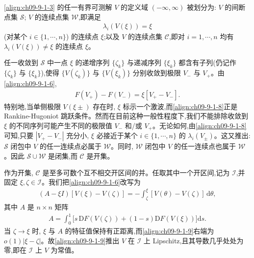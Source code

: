 \documentclass[../../main.tex]{subfiles}
\begin{document}
\eqref{align:ch09-9-1-3} 的任一有界可测解 $V$ 的定义域 $(-\infty,\infty)$ 被划分为: $V$ 的间断点集 $\mathscr{S}$; $V$ 的连续点集 $\mathscr{W}$,即满足
\begin{align}
\lambda_{i}(V(\xi))=\xi
\label{align:ch09-9-1-7}
\end{align}
(对某个 $i\in\{1,\cdots ,n\}$) 的连续点 $\xi$;以及 $V$ 的连续点集 $\mathscr{C}$,即对 $i=1,\cdots ,n$ 均有 $\lambda_{i}(V(\xi))\neq\xi$ 的连续点 $\xi$。

任一收敛到 $\mathscr{S}$ 中一点 $\xi$ 的递增序列 $\{\zeta_{k}\}$ 与递减序列 $\{\xi_{k}\}$ 都含有子列(仍记作 $\{\zeta_{k}\}$ 与 $\{\xi_{k}\}$),使得 $\{V(\zeta_{k})\}$ 与 $\{V(\xi_{k})\}$ 分别收敛到极限 $V_{-}$ 与 $V_{+}$。由\eqref{align:ch09-9-1-6},
\begin{align}
F(V_{+})-F(V_{-})=\xi[V_{+}-V_{-}].
\label{align:ch09-9-1-8}
\end{align}
特别地,当单侧极限 $V(\xi\pm)$ 存在时, $\xi$ 标示一个激波,而\eqref{align:ch09-9-1-8}正是 Rankine-Hugoniot 跳跃条件。然而在目前这种一般性程度下,我们不能排除收敛到 $\xi$ 的不同序列可能产生不同的极限值 $V_{-}$ 和/或 $V_{+}$。无论如何,由\eqref{align:ch09-9-1-8}可知,只要 $|V_{+}-V_{-}|$ 充分小, $\xi$ 必接近于某个 $i\in\{1,\cdots ,n\}$ 的 $\lambda_{i}(V_{\pm})$。这又推出: $\mathscr{S}$ 闭包中 $V$ 的任一连续点必属于 $\mathscr{W}$。同时, $\mathscr{W}$ 闭包中 $V$ 的任一连续点也属于 $\mathscr{W}$。因此 $\mathscr{S}\cup\mathscr{W}$ 是闭集,而 $\mathscr{C}$ 是开集。

作为开集, $\mathscr{C}$ 是至多可数个互不相交开区间的并。任取其中一个开区间,记为 $\mathscr{I}$,并固定 $\xi,\zeta\in\mathscr{I}$。我们把\eqref{align:ch09-9-1-6}改写为
\begin{align}
(A-\xi I)[V(\xi)-V(\zeta)]=-\int_{\zeta}^{\xi}[V(\theta)-V(\zeta)]\,\mathrm{d}\theta,
\label{align:ch09-9-1-9}
\end{align}
其中 $A$ 是 $n\times n$ 矩阵
\begin{align}
A=\int_{0}^{1}\bigl[s\,\mathrm{D}F(V(\zeta))+(1-s)\mathrm{D}F(V(\xi))\bigr]\mathrm{d}s.
\label{align:ch09-9-1-10}
\end{align}
当 $\zeta\to\xi$ 时, $\xi$ 与 $A$ 的特征值保持有正距离,而\eqref{align:ch09-9-1-9}右端为 $o(1)|\xi-\zeta|$。故\eqref{align:ch09-9-1-9}推出 $V$ 在 $\mathscr{I}$ 上 Lipschitz,且其导数几乎处处为零,即在 $\mathscr{I}$ 上 $V$ 为常值。
\end{document}
